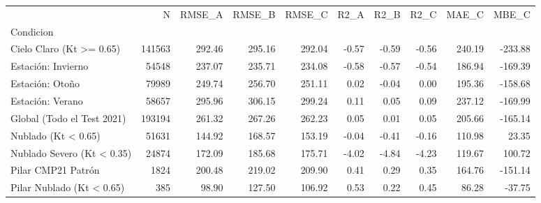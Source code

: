 \begin{tabular}{lrrrrrrrrr}
\toprule
 & N & RMSE_A & RMSE_B & RMSE_C & R2_A & R2_B & R2_C & MAE_C & MBE_C \\
Condicion &  &  &  &  &  &  &  &  &  \\
\midrule
Cielo Claro (Kt >= 0.65) & 141563 & 292.46 & 295.16 & 292.04 & -0.57 & -0.59 & -0.56 & 240.19 & -233.88 \\
Estación: Invierno & 54548 & 237.07 & 235.71 & 234.08 & -0.58 & -0.57 & -0.54 & 186.94 & -169.39 \\
Estación: Otoño & 79989 & 249.74 & 256.70 & 251.11 & 0.02 & -0.04 & 0.00 & 195.36 & -158.68 \\
Estación: Verano & 58657 & 295.96 & 306.15 & 299.24 & 0.11 & 0.05 & 0.09 & 237.12 & -169.99 \\
Global (Todo el Test 2021) & 193194 & 261.32 & 267.26 & 262.23 & 0.05 & 0.01 & 0.05 & 205.66 & -165.14 \\
Nublado (Kt < 0.65) & 51631 & 144.92 & 168.57 & 153.19 & -0.04 & -0.41 & -0.16 & 110.98 & 23.35 \\
Nublado Severo (Kt < 0.35) & 24874 & 172.09 & 185.68 & 175.71 & -4.02 & -4.84 & -4.23 & 119.67 & 100.72 \\
Pilar CMP21 Patrón & 1824 & 200.48 & 219.02 & 209.90 & 0.41 & 0.29 & 0.35 & 164.76 & -151.14 \\
Pilar Nublado (Kt < 0.65) & 385 & 98.90 & 127.50 & 106.92 & 0.53 & 0.22 & 0.45 & 86.28 & -37.75 \\
\bottomrule
\end{tabular}
